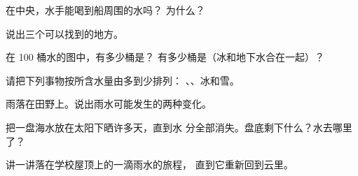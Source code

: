 \begin{exercise}[$\star$]\label{exo:g2:water-on-earth:5}
在中央，水手能喝到船周围的水吗？
为什么？
\end{exercise}

\begin{exercise}[$\star$]\label{exo:g2:water-on-earth:6}
说出三个可以找到的地方。
\end{exercise}

\begin{exercise}[$\star\star$]\label{exo:g2:water-on-earth:7}
在 100 桶水的图中，有多少桶是？
有多少桶是（冰和地下水合在一起）？
\end{exercise}

\begin{exercise}[$\star\star$]\label{exo:g2:water-on-earth:8}
请把下列事物按所含水量由多到少排列：
、、冰和雪。
\end{exercise}

\begin{exercise}[$\star\star$]\label{exo:g2:water-on-earth:9}
雨落在田野上。说出雨水可能发生的两种变化。
\end{exercise}

\begin{exercise}[$\star\star$]\label{exo:g2:water-on-earth:10}
把一盘海水放在太阳下晒许多天，直到水
分全部消失。盘底剩下什么？水去哪里了？
\end{exercise}

\begin{exercise}[$\star\star$]\label{exo:g2:water-on-earth:11}
讲一讲落在学校屋顶上的一滴雨水的旅程，
直到它重新回到云里。
\end{exercise}

